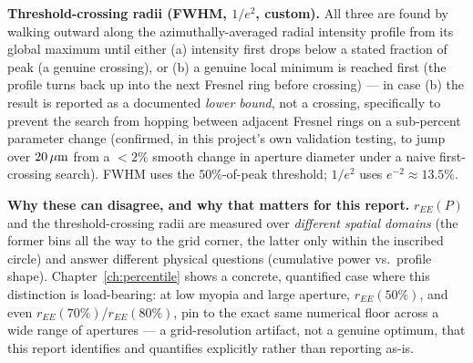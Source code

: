 \textbf{Threshold-crossing radii (FWHM, $1/e^2$, custom).} All three are found by
walking outward along the azimuthally-averaged radial intensity profile from its
global maximum until either (a) intensity first drops below a stated fraction of peak
(a genuine crossing), or (b) a genuine local minimum is reached first (the profile
turns back up into the next Fresnel ring before crossing) --- in case (b) the result is
reported as a documented \emph{lower bound}, not a crossing, specifically to prevent
the search from hopping between adjacent Fresnel rings on a sub-percent parameter
change (confirmed, in this project's own validation testing, to jump over $20\,\mu\text{m}$ from
a $<2\%$ smooth change in aperture diameter under a naive first-crossing search).
FWHM uses the $50\%$-of-peak threshold; $1/e^2$ uses $e^{-2}\approx13.5\%$.

\textbf{Why these can disagree, and why that matters for this report.} $r_{EE}(P)$ and
the threshold-crossing radii are measured over \emph{different spatial domains}
(the former bins all the way to the grid corner, the latter only within the inscribed
circle) and answer different physical questions (cumulative power vs.\ profile shape).
Chapter~\ref{ch:percentile} shows a concrete, quantified case where this distinction is
load-bearing: at low myopia and large aperture, $r_{EE}(50\%)$, and even
$r_{EE}(70\%)$/$r_{EE}(80\%)$, pin to the exact same numerical floor across a wide
range of apertures --- a grid-resolution artifact, not a genuine optimum, that this
report identifies and quantifies explicitly rather than reporting as-is.
